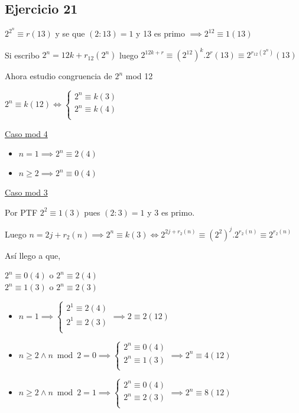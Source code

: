 \subsection{Ejercicio 21}

$ 2^{2^n} \equiv r(13) $ y se que $ (2:13) = 1 $ y 13 es primo $ \implies 2^{12} \equiv 1(13) $

Si escribo $ 2^n = 12k +r_{12}(2^n) $ luego $ 2^{12k+r} \equiv (2^{12})^k . 2^r (13) \equiv 2^{r_{12}(2^n)}(13)$

Ahora estudio congruencia de $ 2^n $ mod 12

$ 2^n \equiv k (12) \iff \begin{cases}
    2^n \equiv k (3) \\
    2^n \equiv k (4) \\
\end{cases} $

\underline{Caso mod 4}

\begin{itemize}
    \item $ n = 1 \implies 2^n \equiv 2(4) $
    \item $ n \geq 2 \implies 2^n \equiv 0(4) $
\end{itemize}

\underline{Caso mod 3}

Por PTF $ 2^2 \equiv 1(3) $ pues $ (2:3) = 1 $ y 3 es primo.

Luego $ n = 2j+r_2(n) \implies 2^n \equiv k(3) \iff 2^{2j+r_2(n)} \equiv (2^2)^j. 2^{r_2(n)} \equiv 2^{r_2(n)} $

Así llego a que,

$ 2^n \equiv 0(4) $ o $ 2^n \equiv 2(4) $ \\
$ 2^n \equiv 1(3) $ o $ 2^n \equiv 2(3) $ 

\begin{itemize}
    \item $ n = 1 \implies \begin{cases}
        2^1 \equiv 2(4) \\
        2^1 \equiv 2(3) \\
    \end{cases} 
    \implies 2 \equiv 2(12) $
    \item $ n \geq 2 \wedge n \bmod 2 = 0 \implies \begin{cases}
        2^n \equiv 0(4) \\
        2^n \equiv 1(3) \\
    \end{cases} 
    \implies 2^n \equiv 4(12) $
    \item $ n \geq 2 \wedge n \bmod 2 = 1 \implies \begin{cases}
        2^n \equiv 0(4) \\
        2^n \equiv 2(3) \\
    \end{cases} 
    \implies 2^n \equiv 8(12) $
\end{itemize}

